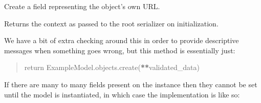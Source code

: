 \documentclass[letterpaper,10pt,english]{sphinxmanual}
\begin{document}
\begin{fulllineitems}
\begin{fulllineitems}
\end{fulllineitems}


\begin{fulllineitems}
\label{\detokenize{tasks:tasks.serializers.TaskSerializer.build_url_field}}
\pysigstartsignatures
{}
\pysigstopsignatures
\sphinxAtStartPar
Create a field representing the object’s own URL.

\end{fulllineitems}


\begin{fulllineitems}
\label{\detokenize{tasks:tasks.serializers.TaskSerializer.context}}
\pysigstartsignatures
{}
\pysigstopsignatures
\sphinxAtStartPar
Returns the context as passed to the root serializer on initialization.

\end{fulllineitems}


\begin{fulllineitems}
\label{\detokenize{tasks:tasks.serializers.TaskSerializer.create}}
\pysigstartsignatures
{}
\pysigstopsignatures
\sphinxAtStartPar
We have a bit of extra checking around this in order to provide
descriptive messages when something goes wrong, but this method is
essentially just:
\begin{quote}

\sphinxAtStartPar
return ExampleModel.objects.create({\color{red}\bfseries{}**}validated\_data)
\end{quote}

\sphinxAtStartPar
If there are many to many fields present on the instance then they
cannot be set until the model is instantiated, in which case the
implementation is like so:
\begin{quote}


\end{quote}
\end{fulllineitems}
\end{fulllineitems}
\end{document}
